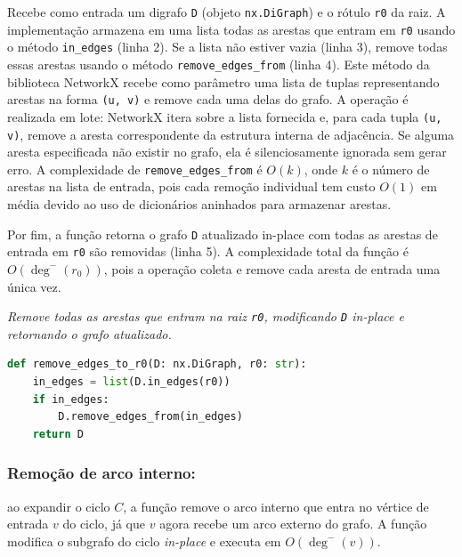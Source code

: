 Recebe como entrada um digrafo \texttt{D} (objeto \texttt{nx.DiGraph}) e o rótulo \texttt{r0} da raiz. A implementação armazena em uma lista todas as arestas que entram em \texttt{r0} usando o método \texttt{in\_edges} (linha 2). Se a lista não estiver vazia (linha 3), remove todas essas arestas usando o método \texttt{remove\_edges\_from} (linha 4). Este método da biblioteca NetworkX recebe como parâmetro uma lista de tuplas representando arestas na forma \texttt{(u, v)} e remove cada uma delas do grafo. A operação é realizada em lote: NetworkX itera sobre a lista fornecida e, para cada tupla \texttt{(u, v)}, remove a aresta correspondente da estrutura interna de adjacência. Se alguma aresta especificada não existir no grafo, ela é silenciosamente ignorada sem gerar erro. A complexidade de \texttt{remove\_edges\_from} é \(O(k)\), onde \(k\) é o número de arestas na lista de entrada, pois cada remoção individual tem custo \(O(1)\) em média devido ao uso de dicionários aninhados para armazenar arestas.

Por fim, a função retorna o grafo \texttt{D} atualizado in-place com todas as arestas de entrada em \texttt{r0} são removidas (linha 5). A complexidade total da função é \(O(\deg^-(r_0))\), pois a operação coleta e remove cada aresta de entrada uma única vez.

\begin{tcolorbox}[
        enhanced, breakable,
        colframe=blue!60!black, colback=blue!2,
        colbacktitle=blue!15, coltitle=black,
        title={Remoção de arestas que entram na raiz},
        boxed title style={sharp corners, boxrule=0.6pt},
        sharp corners, boxrule=0.6pt
    ]
    \emph{Remove todas as arestas que entram na raiz \texttt{r0}, modificando \texttt{D} in-place e retornando o grafo atualizado.}
    \tcblower
    \begin{lstlisting}[mathescape=true, language=Python]
def remove_edges_to_r0(D: nx.DiGraph, r0: str):
    in_edges = list(D.in_edges(r0))
    if in_edges:
        D.remove_edges_from(in_edges)
    return D
\end{lstlisting}
\end{tcolorbox}


\subsubsection{Remoção de arco interno:}
ao expandir o ciclo \(C\), a função remove o arco interno que entra no vértice de entrada \(v\) do ciclo, já que \(v\) agora recebe um arco externo do grafo. A função modifica o subgrafo do ciclo \emph{in-place} e executa em \(O(\deg^-(v))\).

